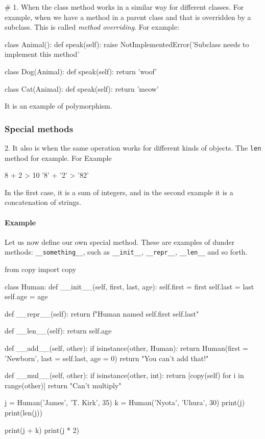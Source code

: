 \# 1. When the class method works in a similar way for different classes. For example, when we have a method in a parent class and that is overridden by a subclass. This is called \emph{method overriding}. For example:
\begin{listing}{1}
class Animal():
    def speak(self):
        raise NotImplementedError('Subclass needs to implement this method'
        
class Dog(Animal):
    def speak(self):
        return 'woof'        

class Cat(Animal):
    def speak(self):
        return 'meow'  
\end{listing}
It is an example of polymorphism.

\subsubsection{Special methods}

2. It also is when the same operation works for different kinds of objects. The \verb|len| method for example. For Example
\begin{listing}{1}
8 + 2
> 10
'8' + '2'
> '82'    
\end{listing}
In the first case, it is a sum of integers, and in the second example it is a concatenation of strings. 

\paragraph{Example}

Let us now define our own special method. These are examples of dunder methods: \verb|__something__|, such as \verb|__init__|, \verb|__repr__|, \verb|__len__| and so forth.
\begin{listing}{1}
from copy import copy

class Human:
    def __init__(self, first, last, age):
        self.first = first
        self.last = last
        self.age = age

    def __repr__(self):
        return f"Human named {self.first} {self.last}"

    def __len__(self):
        return self.age      

    def __add__(self, other):
        if isinstance(other, Human):
            return Human(first = 'Newborn', last = self.last, age = 0)
        return "You can't add that!"

    def __mul__(self, other):
        if isinstance(other, int):
            return [copy(self) for i in range(other)]
        return "Can't multiply"

j = Human('James', 'T. Kirk', 35) 
k = Human('Nyota', 'Uhura', 30) 
print(j)
print(len(j))

print(j + k)
print(j * 2)
\end{listing}
